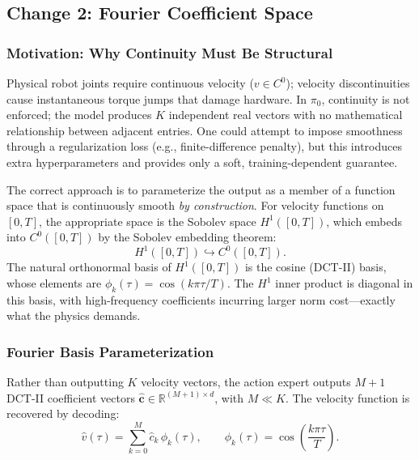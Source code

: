 \documentclass[11pt]{article}
\theoremstyle{plain}
\theoremstyle{definition}
\newcommand{\R}{\mathbb{R}}
\newcommand{\texec}{\tau}
\newcommand{\ccoeff}{\mathbf{c}}
\begin{document}
\subsection{Change 2: Fourier Coefficient Space}
\label{sec:fourier_space}

\subsubsection{Motivation: Why Continuity Must Be Structural}

Physical robot joints require continuous velocity ($v \in C^0$);
velocity discontinuities cause instantaneous torque jumps that damage
hardware.
In $\pi_0$, continuity is not enforced; the model produces $K$ independent
real vectors with no mathematical relationship between adjacent entries.
One could attempt to impose smoothness through a regularization loss
(e.g., finite-difference penalty), but this introduces extra hyperparameters
and provides only a soft, training-dependent guarantee.

The correct approach is to parameterize the output as a member of a
function space that is continuously smooth \emph{by construction}.
For velocity functions on $[0,T]$, the appropriate space is the Sobolev
space $H^1([0,T])$, which embeds into $C^0([0,T])$ by the Sobolev
embedding theorem:
\begin{equation}
  H^1([0,T]) \hookrightarrow C^0([0,T]).
\end{equation}
The natural orthonormal basis of $H^1([0,T])$ is the cosine (DCT-II) basis,
whose elements are $\phi_k(\texec) = \cos(k\pi\texec/T)$.
The $H^1$ inner product is diagonal in this basis, with high-frequency
coefficients incurring larger norm cost---exactly what the physics demands.

\subsubsection{Fourier Basis Parameterization}

Rather than outputting $K$ velocity vectors, the action expert outputs
$M+1$ DCT-II coefficient vectors $\hat{\ccoeff} \in \R^{(M+1)\times d}$,
with $M \ll K$.
The velocity function is recovered by decoding:
\begin{equation}
  \label{eq:decode}
  \hat{v}(\texec) = \sum_{k=0}^{M} \hat{c}_k\,\phi_k(\texec),
  \qquad
  \phi_k(\texec) = \cos\!\left(\frac{k\pi\texec}{T}\right).
\end{equation}
\end{document}
